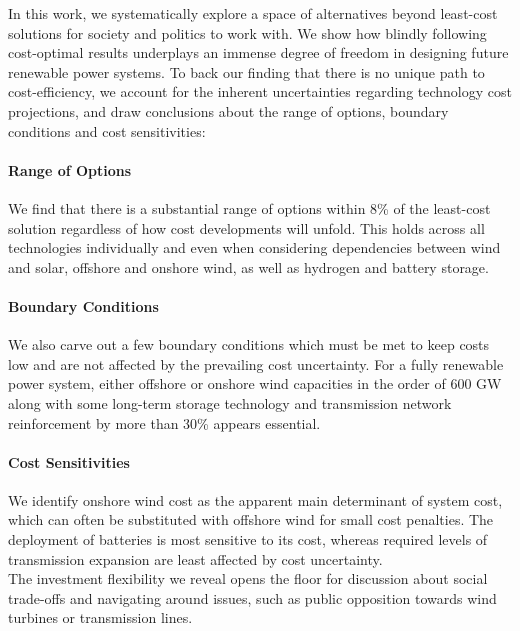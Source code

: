 
In this work, we
systematically explore a space of alternatives beyond least-cost solutions
for society and politics to work with.
We show how blindly following cost-optimal results
underplays an immense degree of freedom in designing future renewable power systems.
To back our finding that there is no unique path to cost-efficiency,
we account for the inherent uncertainties regarding technology cost projections,
and draw conclusions about the range of options, boundary conditions and cost sensitivities:

\paragraph{Range of Options}
We find that there is a substantial range of options
within 8\% of the least-cost solution
regardless of how cost developments will unfold.
This holds across all technologies individually
and even when considering dependencies between
wind and solar, offshore and onshore wind, as well as hydrogen and battery storage.
\paragraph{Boundary Conditions}
We also carve out a few boundary conditions which
must be met to keep costs low and are not affected
by the prevailing cost uncertainty.
For a fully renewable power system,
either offshore or onshore wind capacities
in the order of 600 GW
along with some long-term storage technology and
transmission network reinforcement by more than 30\% appears essential.
\paragraph{Cost Sensitivities}
We identify onshore wind cost as the apparent main determinant of system cost,
which can often be substituted with offshore wind for small cost penalties.
The deployment of batteries is most sensitive to its cost,
whereas required levels of transmission expansion are least affected by cost uncertainty. \\

The investment flexibility we reveal
opens the floor for discussion about social trade-offs and navigating
around issues, such as public opposition towards wind turbines or transmission lines.
